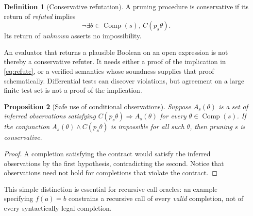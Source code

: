 \documentclass[11pt,a4paper]{article}
\newcommand{\Comp}{\operatorname{Comp}}
\newtheorem{proposition}{Proposition}[section]
\theoremstyle{definition}
\newtheorem{definition}[proposition]{Definition}
\theoremstyle{remark}
\begin{document}
\begin{definition}[Conservative refutation]
A pruning procedure is conservative if its return of \emph{refuted} implies
\begin{equation}\label{eq:refute}
  \neg\exists\theta\in\Comp(s),\ C(p_s\theta).
\end{equation}
Its return of \emph{unknown} asserts no impossibility.
\end{definition}

An evaluator that returns a plausible Boolean on an open expression is not
thereby a conservative refuter. It needs either a proof of the implication in
\eqref{eq:refute}, or a verified semantics whose soundness supplies that proof
schematically. Differential tests can discover violations, but agreement on a
large finite test set is not a proof of the implication.

\begin{proposition}[Safe use of conditional observations]\label{prop:conditional}
Suppose $A_s(\theta)$ is a set of inferred observations satisfying
$C(p_s\theta)\Rightarrow A_s(\theta)$ for every $\theta\in\Comp(s)$.
If the conjunction $A_s(\theta)\land C(p_s\theta)$ is impossible for all such
$\theta$, then pruning $s$ is conservative.
\end{proposition}
\begin{proof}
A completion satisfying the contract would satisfy the inferred observations
by the first hypothesis, contradicting the second. Notice that observations
need not hold for completions that violate the contract.
\end{proof}
This simple distinction is essential for recursive-call oracles: an example
specifying $f(a)=b$ constrains a recursive call of every \emph{valid} completion,
not of every syntactically legal completion.
\end{document}

